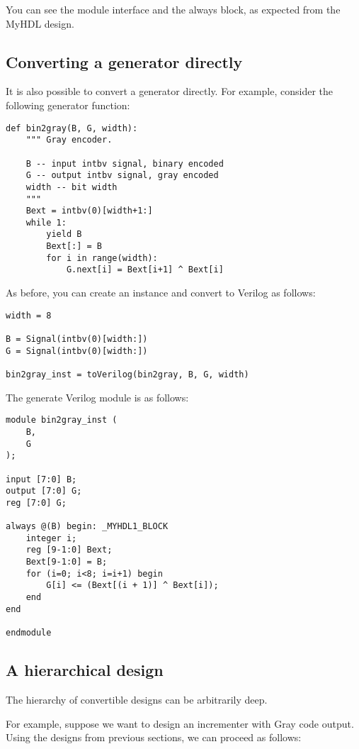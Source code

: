 You can see the module interface and the always block, as expected
from the MyHDL design. 

\subsection{Converting a generator directly\label{conv-usage-gen}}

It is also possible to convert a generator
directly. For example, consider the following generator function:

\begin{verbatim}
def bin2gray(B, G, width):
    """ Gray encoder.

    B -- input intbv signal, binary encoded
    G -- output intbv signal, gray encoded
    width -- bit width
    """
    Bext = intbv(0)[width+1:]
    while 1:
        yield B
        Bext[:] = B
        for i in range(width):
            G.next[i] = Bext[i+1] ^ Bext[i]
\end{verbatim}

As before, you can create an instance and convert to
Verilog as follows:

\begin{verbatim}
width = 8

B = Signal(intbv(0)[width:])
G = Signal(intbv(0)[width:])

bin2gray_inst = toVerilog(bin2gray, B, G, width)
 \end{verbatim}

The generate Verilog module is as follows:

\begin{verbatim}
module bin2gray_inst (
    B,
    G
);

input [7:0] B;
output [7:0] G;
reg [7:0] G;

always @(B) begin: _MYHDL1_BLOCK
    integer i;
    reg [9-1:0] Bext;
    Bext[9-1:0] = B;
    for (i=0; i<8; i=i+1) begin
        G[i] <= (Bext[(i + 1)] ^ Bext[i]);
    end
end

endmodule
\end{verbatim}

\subsection{A hierarchical design\label{conv-usage-hier}}
The hierarchy of convertible designs can be
arbitrarily deep.

For example, suppose we want to design an
incrementer with Gray code output. Using the
designs from previous sections, we can proceed
as follows:

